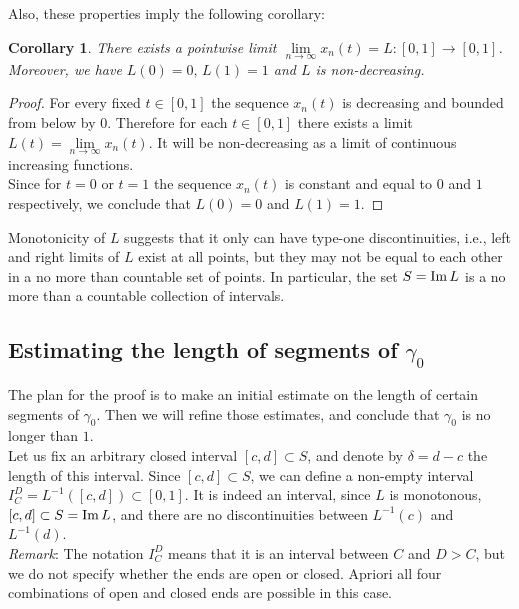 \documentclass{article}
\newtheorem{corollary}[theorem]{Corollary}
\theoremstyle{definition}
\newcommand{\im}{\mathop{\rm Im}\nolimits}
\newcommand{\lims}{\limits}
\newcommand{\Inf}{\infty}
\begin{document}
    Also, these properties imply the following corollary:
    \begin{corollary}
    \label{limit}
        There exists a pointwise limit $\lim\lims_{n\to\Inf}x_n(t) = L\colon [0, 1]\to[0, 1]$.
        Moreover, we have $L(0) = 0,\, L(1) = 1$ and $L$ is non-decreasing.
    \end{corollary}
    \begin{proof}[Proof]
        For every fixed $t\in[0, 1]$ the sequence $x_n(t)$ is decreasing and bounded from below by $0$. Therefore for each $t\in[0, 1]$ there exists a limit $L(t) = \lim\lims_{n\to\Inf}x_n(t)$. It will be non-decreasing as a limit of continuous increasing functions.\\
        Since for $t = 0$ or $t=1$ the sequence $x_n(t)$ is constant and equal to $0$ and $1$ respectively, we conclude that $L(0) = 0$ and $L(1) = 1$.
    \end{proof}
    
    Monotonicity of $L$ suggests that it only can have type-one discontinuities, i.e., left and right limits of $L$ exist at all points, but they may not be equal to each other in a no more than countable set of points. In particular, the set $S = \im L$ is a no more than a countable collection of intervals.\\

\subsection{Estimating the length of segments of $\gamma_0$}

    The plan for the proof is to make an initial estimate on the length of certain segments of $\gamma_0$. Then we will refine those estimates, and conclude that $\gamma_0$ is no longer than $1$.\\
    
    Let us fix an arbitrary closed interval $[c, d]\subset S$, and denote by $\delta = d - c$ the length of this interval. Since $[c, d]\subset S$, we can define a non-empty interval $I_C^D = L^{-1}([c, d]) \subset [0, 1]$. It is indeed an interval, since $L$ is monotonous, $[c, d]\subset S = \im L$, and there are no discontinuities between $L^{-1}(c)$ and $L^{-1}(d)$.\\
    
    \textit{Remark}: The notation $I_C^D$ means that it is an interval between $C$ and $D > C$, but we do not specify whether the ends are open or closed. Apriori all four combinations of open and closed ends are possible in this case.\\
    
\end{document}

